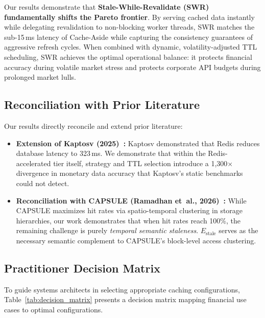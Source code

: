 \documentclass[11pt,a4paper]{article}
\begin{document}
Our results demonstrate that \textbf{Stale-While-Revalidate (SWR) fundamentally shifts the Pareto frontier}. By serving cached data instantly while delegating revalidation to non-blocking worker threads, SWR matches the sub-15\,ms latency of Cache-Aside while capturing the consistency guarantees of aggressive refresh cycles. When combined with dynamic, volatility-adjusted TTL scheduling, SWR achieves the optimal operational balance: it protects financial accuracy during volatile market stress and protects corporate API budgets during prolonged market lulls.

\subsection{Reconciliation with Prior Literature}

Our results directly reconcile and extend prior literature:
\begin{itemize}
  \item \textbf{Extension of Kaptosv (2025)~\cite{kaptosv2025}:} Kaptosv demonstrated that Redis reduces database latency to 323\,ms. We demonstrate that within the Redis-accelerated tier itself, strategy and TTL selection introduce a 1{,}300$\times$ divergence in monetary data accuracy that Kaptosv's static benchmarks could not detect.
  \item \textbf{Reconciliation with CAPSULE (Ramadhan et~al., 2026)~\cite{capsule2026}:} While CAPSULE maximizes hit rates via spatio-temporal clustering in storage hierarchies, our work demonstrates that when hit rates reach 100\%, the remaining challenge is purely \textit{temporal semantic staleness}. $E_{\text{stale}}$ serves as the necessary semantic complement to CAPSULE's block-level access clustering.
\end{itemize}

\subsection{Practitioner Decision Matrix}

To guide systems architects in selecting appropriate caching configurations, Table~\ref{tab:decision_matrix} presents a decision matrix mapping financial use cases to optimal configurations.
\end{document}
